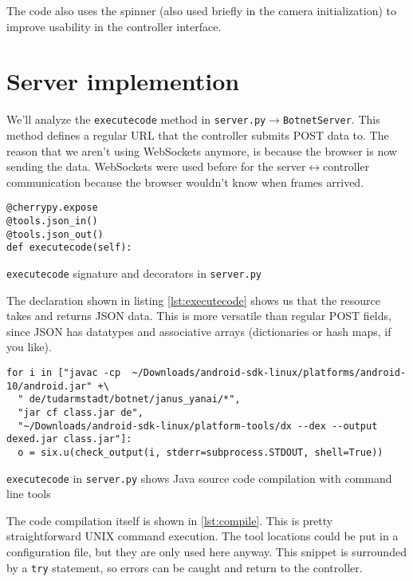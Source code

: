 \documentclass[a4paper]{report}
\newcommand{\classname}[1]{\texttt{#1}}
\newcommand{\methodname}[1]{\texttt{#1}}
\newcommand{\filename}[1]{\texttt{#1}}
\begin{document}
{The code also uses the spinner (also used briefly in the camera initialization) to improve usability in the controller interface.
\section{Server implemention}
We'll analyze the \methodname{executecode} method in \filename{server.py}$\rightarrow$\classname{BotnetServer}. This method defines a regular URL that the controller submits POST data to. The reason that we aren't using WebSockets anymore, is because the browser is now sending the data. WebSockets were used before for the server$\leftrightarrow$controller communication because the browser wouldn't know when frames arrived.

\begin{listing}[H]
\begin{verbatim}
@cherrypy.expose
@tools.json_in()
@tools.json_out()
def executecode(self):
\end{verbatim}
\caption{\methodname{executecode} signature and decorators in \filename{server.py}}
\label{lst:executecode}
\end{listing}

The declaration shown in listing \ref{lst:executecode} shows us that the resource takes and returns JSON data. This is more versatile than regular POST fields, since JSON has datatypes and associative arrays (dictionaries or hash maps, if you like).

\begin{listing}[H]
\begin{verbatim}
for i in ["javac -cp  ~/Downloads/android-sdk-linux/platforms/android-10/android.jar" +\
  " de/tudarmstadt/botnet/janus_yanai/*",
  "jar cf class.jar de",
  "~/Downloads/android-sdk-linux/platform-tools/dx --dex --output dexed.jar class.jar"]:
  o = six.u(check_output(i, stderr=subprocess.STDOUT, shell=True))
\end{verbatim}
\caption{\methodname{executecode} in \filename{server.py} shows Java source code compilation with command line tools}
\label{lst:compile}
\end{listing}

The code compilation itself is shown in \ref{lst:compile}. This is pretty straightforward UNIX command execution. The tool locations could be put in a configuration file, but they are only used here anyway. This snippet is surrounded by a \texttt{try} statement, so errors can be caught and return to the controller.

}
\end{document}
